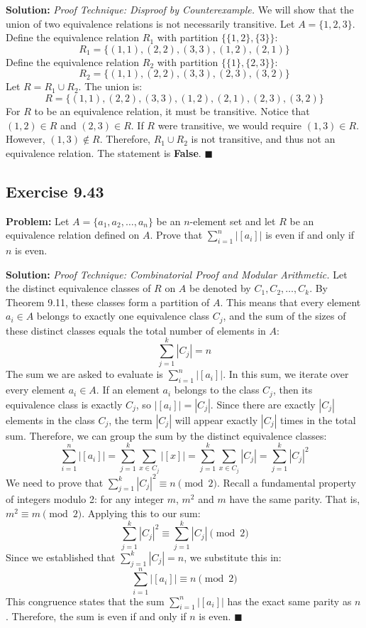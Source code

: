 \documentclass[11pt, a4paper]{article}
\theoremstyle{definition}
\theoremstyle{remark}
\begin{document}
\textbf{Solution:}
\textit{Proof Technique: Disproof by Counterexample.}
We will show that the union of two equivalence relations is not necessarily transitive.
Let $A = \{1, 2, 3\}$. 
Define the equivalence relation $R_1$ with partition $\{\{1, 2\}, \{3\}\}$:
\[
    R_1 = \{ (1,1), (2,2), (3,3), (1,2), (2,1) \}
\]
Define the equivalence relation $R_2$ with partition $\{\{1\}, \{2, 3\}\}$:
\[
    R_2 = \{ (1,1), (2,2), (3,3), (2,3), (3,2) \}
\]
Let $R = R_1 \cup R_2$. The union is:
\[
    R = \{ (1,1), (2,2), (3,3), (1,2), (2,1), (2,3), (3,2) \}
\]
For $R$ to be an equivalence relation, it must be transitive. 
Notice that $(1, 2) \in R$ and $(2, 3) \in R$. If $R$ were transitive, we would require $(1, 3) \in R$. 
However, $(1, 3) \notin R$. 
Therefore, $R_1 \cup R_2$ is not transitive, and thus not an equivalence relation. The statement is \textbf{False}.
$\blacksquare$

\subsection*{Exercise 9.43}
\textbf{Problem:} Let $A = \{a_1, a_2, \dots, a_n\}$ be an $n$-element set and let $R$ be an equivalence relation defined on $A$. Prove that $\sum_{i=1}^n |[a_i]|$ is even if and only if $n$ is even.

\textbf{Solution:}
\textit{Proof Technique: Combinatorial Proof and Modular Arithmetic.}
Let the distinct equivalence classes of $R$ on $A$ be denoted by $C_1, C_2, \dots, C_k$. By Theorem 9.11, these classes form a partition of $A$. 
This means that every element $a_i \in A$ belongs to exactly one equivalence class $C_j$, and the sum of the sizes of these distinct classes equals the total number of elements in $A$:
\[
    \sum_{j=1}^k |C_j| = n
\]
The sum we are asked to evaluate is $\sum_{i=1}^n |[a_i]|$. In this sum, we iterate over every element $a_i \in A$. 
If an element $a_i$ belongs to the class $C_j$, then its equivalence class is exactly $C_j$, so $|[a_i]| = |C_j|$. 
Since there are exactly $|C_j|$ elements in the class $C_j$, the term $|C_j|$ will appear exactly $|C_j|$ times in the total sum. 
Therefore, we can group the sum by the distinct equivalence classes:
\[
    \sum_{i=1}^n |[a_i]| = \sum_{j=1}^k \sum_{x \in C_j} |[x]| = \sum_{j=1}^k \sum_{x \in C_j} |C_j| = \sum_{j=1}^k |C_j|^2
\]
We need to prove that $\sum_{j=1}^k |C_j|^2 \equiv n \pmod 2$.
Recall a fundamental property of integers modulo 2: for any integer $m$, $m^2$ and $m$ have the same parity. That is, $m^2 \equiv m \pmod 2$.
Applying this to our sum:
\[
    \sum_{j=1}^k |C_j|^2 \equiv \sum_{j=1}^k |C_j| \pmod 2
\]
Since we established that $\sum_{j=1}^k |C_j| = n$, we substitute this in:
\[
    \sum_{i=1}^n |[a_i]| \equiv n \pmod 2
\]
This congruence states that the sum $\sum_{i=1}^n |[a_i]|$ has the exact same parity as $n$. Therefore, the sum is even if and only if $n$ is even.
$\blacksquare$
\end{document}
